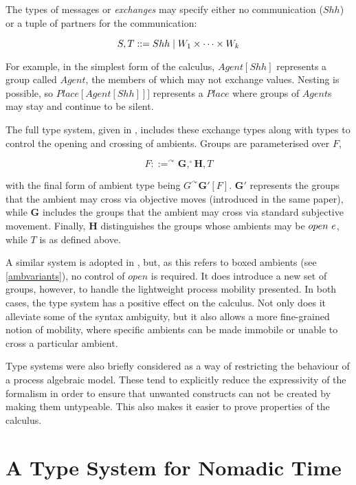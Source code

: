 The types of messages or \emph{exchanges} may specify either no
communication ($Shh$) or a tuple of partners for the communication:

\begin{equation}
S, T ::= Shh \;|\; W_1 \times \dots \times W_k
\end{equation}

\noindent For example, in the simplest form of the calculus,
$Agent[Shh]$ represents a group called $Agent$, the members of which may
not exchange values.  Nesting is possible, so $Place[Agent[Shh]]]$
represents a $Place$ where groups of $Agent$s may stay and continue to
be silent.

The full type system, given in \cite{ambienttypes}, includes these
exchange types along with types to control the opening and crossing of
ambients.  Groups are parameterised over $F$,

\begin{equation}
F ::= ^\curvearrowright \mathbf{G}, ^\circ \mathbf{H}, T
\end{equation}

\noindent with the final form of ambient type being $G^\curvearrowright
\mathbf{G'}[F]$.  $\mathbf{G'}$ represents the groups that the ambient
may cross via objective moves (introduced in the same paper), while
$\mathbf{G}$ includes the groups that the ambient may cross via standard
subjective movement.  Finally, $\mathbf{H}$ distinguishes the groups
whose ambients may be $open\ e$, while $T$ is as defined above.

A similar system is adopted in \cite{m3}, but, as this refers to boxed
ambients (see \ref{ambvariants}), no control of $open$ is required.  It
does introduce a new set of groups, however, to handle the lightweight
process mobility presented.  In both cases, the type system has a
positive effect on the calculus.  Not only does it alleviate some of
the syntax ambiguity, but it also allows a more fine-grained notion of
mobility, where specific ambients can be made immobile or unable to
cross a particular ambient.

Type systems were also briefly considered as a way of restricting the
behaviour of a process algebraic model.  These tend to explicitly reduce
the expressivity of the formalism in order to ensure that unwanted
constructs can not be created by making them untypeable.  This also
makes it easier to prove properties of the calculus.  

\section{A Type System for Nomadic Time}
\label{typesys}

